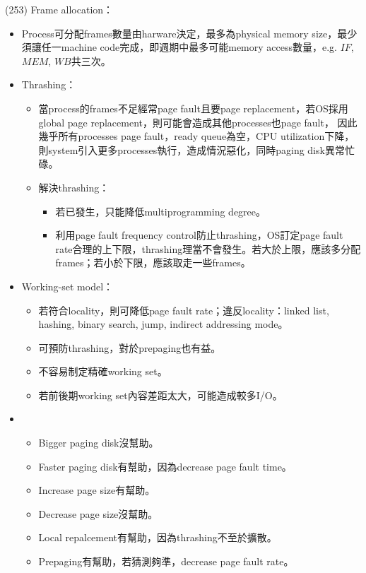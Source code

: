 \begin{theorem}{(253)} Frame allocation：\begin{itemize}
        \item Process可分配frames數量由harware決定，最多為physical memory size，最少須讓任一machine code完成，即週期中最多可能memory access數量，e.g. $IF$, $MEM$, $WB$共三次。
        \item Thrashing：\begin{itemize}
            \item 當process的frames不足經常page fault且要page replacement，若OS採用global page replacement，則可能會造成其他processes也page fault，
            因此幾乎所有processes page fault，ready queue為空，CPU utilization下降，則system引入更多processes執行，造成情況惡化，同時paging disk異常忙碌。
            \item 解決thrashing：\begin{itemize}
                \item 若已發生，只能降低multiprogramming degree。
                \item 利用page fault frequency control防止thrashing，OS訂定page fault rate合理的上下限，thrashing理當不會發生。若大於上限，應該多分配frames；若小於下限，應該取走一些frames。
            \end{itemize}
        \end{itemize}
        \item Working-set model：\begin{itemize}
            \item 若符合locality，則可降低page fault rate；違反locality：linked list, hashing, binary search, jump, indirect addressing mode。
            \item 可預防thrashing，對於prepaging也有益。
            \item 不容易制定精確working set。
            \item 若前後期working set內容差距太大，可能造成較多I/O。
        \end{itemize}
        \item \begin{itemize}
            \item Bigger paging disk沒幫助。
            \item Faster paging disk有幫助，因為decrease page fault time。
            \item Increase page size有幫助。
            \item Decrease page size沒幫助。
            \item Local repalcement有幫助，因為thrashing不至於擴散。
            \item Prepaging有幫助，若猜測夠準，decrease page fault rate。
        \end{itemize}
    \end{itemize}
\end{theorem}

